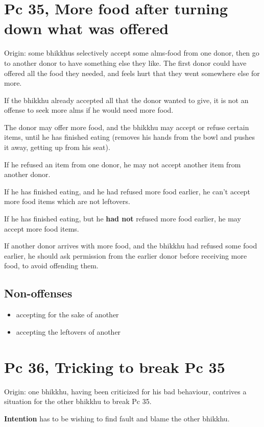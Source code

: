\section{Pc 35, More food after turning down what was offered}

Origin: some bhikkhus selectively accept some alms-food from one donor,
then go to another donor to have something else they like. The first
donor could have offered all the food they needed, and feels hurt that
they went somewhere else for more.

If the bhikkhu already accepted all that the donor wanted to give, it is
not an offense to seek more alms if he would need more food.

The donor may offer more food, and the bhikkhu may accept or refuse
certain items, until he has finished eating (removes his hands from the
bowl and pushes it away, getting up from his seat).

If he refused an item from one donor, he may not accept another item
from another donor.

If he has finished eating, and he had refused more food earlier, he
can't accept more food items which are not leftovers.

If he has finished eating, but he \textbf{had not} refused more food
earlier, he may accept more food items.

If another donor arrives with more food, and the bhikkhu had refused
some food earlier, he should ask permission from the earlier donor
before receiving more food, to avoid offending them.

\subsection{Non-offenses}

\begin{itemize}
\tightlist
\item
  accepting for the sake of another
\item
  accepting the leftovers of another
\end{itemize}

\section{Pc 36, Tricking to break Pc 35}

Origin: one bhikkhu, having been criticized for his bad behaviour,
contrives a situation for the other bhikkhu to break Pc 35.

\textbf{Intention} has to be wishing to find fault and blame the other
bhikkhu.

